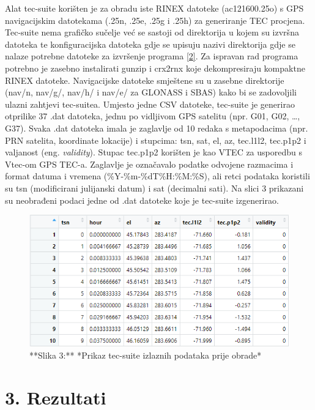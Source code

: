 \documentclass[
]{article}
\begin{document}
Alat tec-suite korišten je za obradu iste RINEX datoteke (ac121600.25o)
s GPS navigacijskim datotekama (.25n, .25e, .25g i .25h) za generiranje
TEC procjena. Tec-suite nema grafičko sučelje već se sastoji od
direktorija u kojem su izvršna datoteka te konfiguracijska datoteka gdje
se upisuju nazivi direktorija gdje se nalaze potrebne datoteke za
izvršenje programa \hyperref[izvori]{{[}2{]}}. Za ispravan rad programa
potrebno je zasebno instalirati gunzip i crx2rnx koje dekompresiraju
kompaktne RINEX datoteke. Navigacijske datoteke smještene su u zasebne
direktorije (nav/n, nav/g/, nav/h/ i nav/e/ za GLONASS i SBAS) kako bi
se zadovoljili ulazni zahtjevi tec-suitea. Umjesto jedne CSV datoteke,
tec-suite je generirao otprilike 37 .dat datoteka, jednu po vidljivom
GPS satelitu (npr. G01, G02, \ldots, G37). Svaka .dat datoteka imala je
zaglavlje od 10 redaka s metapodacima (npr. PRN satelita, koordinate
lokacije) i stupcima: tsn, sat, el, az, tec.l1l2, tec.p1p2 i valjanost
(eng. \emph{validity}). Stupac tec.p1p2 korišten je kao VTEC za
usporedbu s Vtec-om GPS TEC-a. Zaglavlje je označavalo podatke odvojene
razmacima i format datuma i vremena (\%Y-\%m-\%dT\%H:\%M:\%S), ali retci
podataka koristili su tsn (modificirani julijanski datum) i sat
(decimalni sati). Na slici 3 prikazani su neobrađeni podaci jedne od
.dat datoteke koje je tec-suite izgenerirao.

\begin{figure}

{\centering \includegraphics[width=0.7\linewidth]{./slike/tec-suite-data} 

}

\caption{**Slika 3:** *Prikaz tec-suite izlaznih podataka prije obrade*}\label{fig:tesuite_izlaznih_podataka_prije_obrade}
\end{figure}

\section{3. Rezultati}\label{rezultati}
\end{document}
